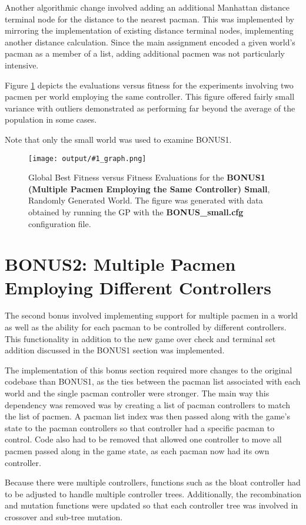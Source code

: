 \documentclass[11pt]{article}
\newcommand{\fitnessplotcaption}[2]{\caption{Global Best Fitness versus Fitness Evaluations for the \textbf{{#1}}, Randomly Generated World. The figure was generated with data obtained by running the GP with the \textbf{{#2}} configuration file.}}
\newcommand{\addgraphic}[1]{\centerline{\texttt{[image: output/\#1\_graph.png]}}}
\begin{document}
Another algorithmic change involved adding an additional Manhattan distance terminal node
for the distance to the nearest pacman. This was implemented by mirroring the implementation of existing
distance terminal nodes, implementing another distance calculation. Since the main assignment 
encoded a given world's pacman as a member of a list,
adding additional pacmen was not particularly intensive.

Figure \ref{fig:bonus_small} depicts the evaluations versus fitness for the experiments involving
two pacmen per world employing the same controller. This figure offered fairly small variance with
outliers demonstrated as performing far beyond the average of the population in some cases.

Note that only the small world was used to examine BONUS1.

\begin{figure}[H]
    \addgraphic{BONUS_small}
    \fitnessplotcaption{BONUS1 (Multiple Pacmen Employing the Same Controller) Small}{BONUS\_small.cfg}
    \label{fig:bonus_small}
\end{figure}


\section{BONUS2: Multiple Pacmen Employing Different Controllers}

The second bonus involved implementing support for multiple pacmen in a world as well
as the ability for each pacman to be controlled by different controllers. This functionality
in addition to the new game over check and terminal set addition discussed in the BONUS1 
section was implemented.

The implementation of this bonus section required more changes to the original codebase than BONUS1,
as the ties between the pacman list associated with each world and the single pacman
controller were stronger. The main way this dependency was removed was by creating 
a list of pacman controllers to match the list of pacmen. A pacman list index was then passed along 
with the game's state to the pacman controllers so that controller had a specific pacman
to control. Code also had to be removed that allowed one controller to move all pacmen
passed along in the game state, as each pacman now had its own controller.

Because there were multiple controllers, functions such as the bloat controller had
to be adjusted to handle multiple controller trees. Additionally, the recombination and mutation functions
were updated so that each controller tree was involved in crossover and sub-tree mutation. 
\end{document}
